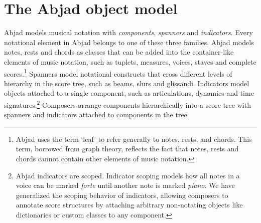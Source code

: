 \documentclass{article}
\begin{document}

\section{The Abjad object model} \label{sec:object-model}

Abjad models musical notation with \emph{components}, \emph{spanners} and
\emph{indicators}. Every notational element in Abjad belongs to one of these
three families. Abjad models notes, rests
and chords as classes that can be added into the container-like elements of music notation,
such as tuplets, measures, voices, staves and complete scores.\footnote{Abjad
uses the term `leaf' to refer generally to notes, rests, and chords. This term,
borrowed from graph theory, reflects the fact that notes, rests and chords
cannot contain other elements of music notation.} Spanners model notational constructs
that cross different levels of hierarchy in the score tree, such as beams,
slurs and glissandi. Indicators model objects attached to a single
component, such as articulations, dynamics and time signatures.\footnote{Abjad indicators are scoped. Indicator scoping models how all notes in a voice can be marked
\emph{forte} until another note is marked \emph{piano}. We have generalized
the scoping behavior of indicators, allowing composers to annotate score
structures by attaching arbitrary non-notating objects like dictionaries or
custom classes to any component.} Composers arrange
components hierarchically into a score tree with spanners and indicators attached to components in the tree.
\end{document}
